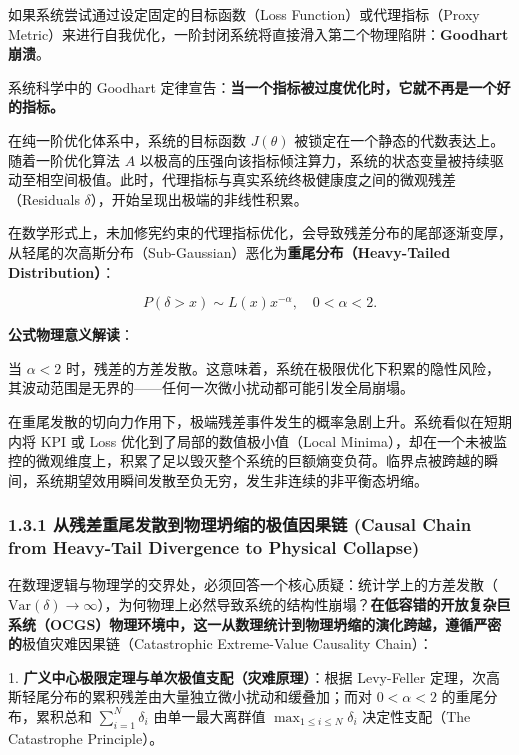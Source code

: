 \documentclass[11pt,a4paper,oneside]{ctexart}
\begin{document}
如果系统尝试通过设定固定的目标函数（Loss Function）或代理指标（Proxy Metric）来进行自我优化，一阶封闭系统将直接滑入第二个物理陷阱：\textbf{Goodhart 崩溃}。


系统科学中的 Goodhart 定律宣告：\textbf{当一个指标被过度优化时，它就不再是一个好的指标。}


在纯一阶优化体系中，系统的目标函数 $J(\theta)$ 被锁定在一个静态的代数表达上。随着一阶优化算法 $A$ 以极高的压强向该指标倾注算力，系统的状态变量被持续驱动至相空间极值。此时，代理指标与真实系统终极健康度之间的微观残差（Residuals $\delta$），开始呈现出极端的非线性积累。


在数学形式上，未加修宪约束的代理指标优化，会导致残差分布的尾部逐渐变厚，从轻尾的次高斯分布（Sub-Gaussian）恶化为\textbf{重尾分布（Heavy-Tailed Distribution）}：


\begin{equation}
P(\delta > x) \sim L(x) x^{-\alpha}, \quad 0 < \alpha < 2.
\end{equation}

\begin{notebox}
\textbf{公式物理意义解读}：

当 $\alpha < 2$ 时，残差的方差发散。这意味着，系统在极限优化下积累的隐性风险，其波动范围是无界的------任何一次微小扰动都可能引发全局崩塌。
\end{notebox}

在重尾发散的切向力作用下，极端残差事件发生的概率急剧上升。系统看似在短期内将 KPI 或 Loss 优化到了局部的数值极小值（Local Minima），却在一个未被监控的微观维度上，积累了足以毁灭整个系统的巨额熵变负荷。临界点被跨越的瞬间，系统期望效用瞬间发散至负无穷，发生非连续的非平衡态坍缩。


\subsubsection{1.3.1 从残差重尾发散到物理坍缩的极值因果链 (Causal Chain from Heavy-Tail Divergence to Physical Collapse)}

在数理逻辑与物理学的交界处，必须回答一个核心质疑：\textit{}统计学上的方差发散（$\text{Var}(\delta) \to \infty$），为何物理上必然导致系统的结构性崩塌？\textbf{在低容错的开放复杂巨系统（OCGS）物理环境中，这一从数理统计到物理坍缩的演化跨越，遵循严密的}极值灾难因果链（Catastrophic Extreme-Value Causality Chain）\textit{}：


1. \textbf{广义中心极限定理与单次极值支配（灾难原理）}：根据 Levy-Feller 定理，次高斯轻尾分布的累积残差由大量独立微小扰动和缓叠加；而对 $0 < \alpha < 2$ 的重尾分布，累积总和 $\sum_{i=1}^{N} \delta_i$ 由单一最大离群值 $\max_{1 \le i \le N} \delta_i$ 决定性支配（The Catastrophe Principle）。
\end{document}

